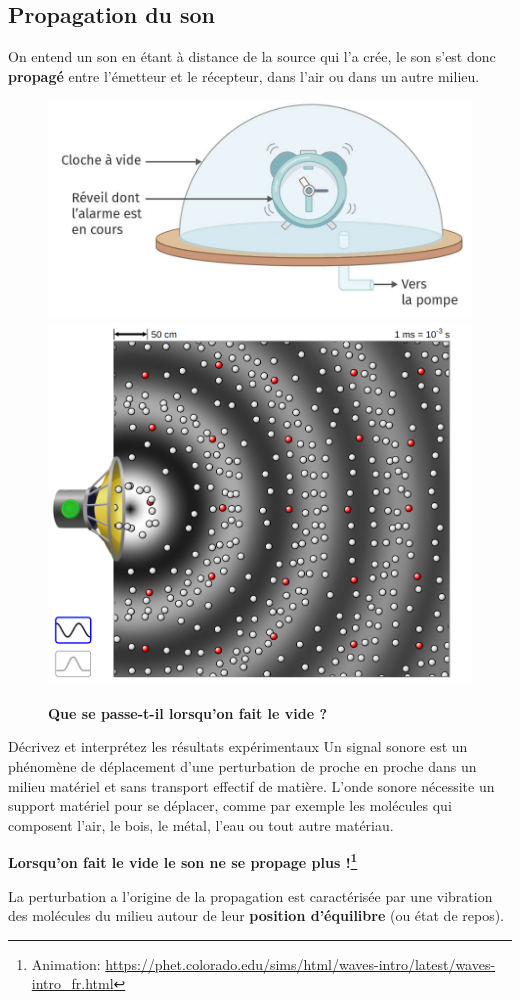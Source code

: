 \documentclass[french]{article}
\begin{document}
\subsection{Propagation du son}

On entend un son en étant à distance de la source qui l'a crée, le son s'est donc \textbf{propagé} entre l'émetteur et le récepteur, dans l'air ou dans un autre milieu.\smallskip 


\begin{figure}[ht!]
	\centering
	\caption{\textbf{Que se passe-t-il lorsqu'on fait le vide ? }}
	\includegraphics[width=.4\textwidth]{./figures/SonsDansUneClocheAVide.png}\hspace{2cm}
	\includegraphics[width=.25\textwidth]{./figures/PropagationDunSon.png}\hfill
\end{figure}
\begin{definition}{Décrivez et interprétez les résultats expérimentaux }
	Un signal sonore est un phénomène de déplacement d'une perturbation de proche en proche dans un milieu matériel et sans transport effectif de matière. L'onde sonore nécessite un support matériel pour se déplacer, comme par exemple les molécules qui composent l'air, le bois, le métal, l'eau ou tout autre matériau.
\end{definition}
\begin{center}
\textbf{Lorsqu'on fait le vide le son ne se propage plus !\footnote{Animation: \url{https://phet.colorado.edu/sims/html/waves-intro/latest/waves-intro_fr.html}} }\smallskip
\end{center}
La perturbation a l'origine de la propagation est caractérisée par une vibration des molécules du milieu autour de leur \textbf{position d'équilibre} (ou état de repos).\bigskip 
\end{document}
